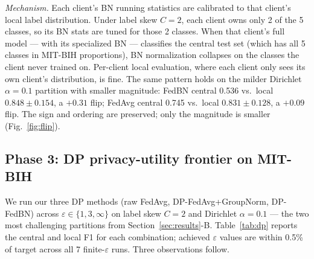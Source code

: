 \documentclass[conference]{IEEEtran}
\begin{document}
\emph{Mechanism.} Each client's BN running statistics are calibrated to that client's local label distribution. Under label skew $C{=}2$, each client owns only 2 of the 5 classes, so its BN stats are tuned for those 2 classes. When that client's full model --- with its specialized BN --- classifies the central test set (which has all 5 classes in MIT-BIH proportions), BN normalization collapses on the classes the client never trained on. Per-client local evaluation, where each client only sees its own client's distribution, is fine. The same pattern holds on the milder Dirichlet $\alpha{=}0.1$ partition with smaller magnitude: FedBN central 0.536 vs.\ local $0.848 \pm 0.154$, a $+0.31$ flip; FedAvg central 0.745 vs.\ local $0.831 \pm 0.128$, a $+0.09$ flip. The sign and ordering are preserved; only the magnitude is smaller (Fig.~\ref{fig:flip}).

\subsection{Phase 3: DP privacy-utility frontier on MIT-BIH}
We run our three DP methods (raw FedAvg, DP-FedAvg+GroupNorm, DP-FedBN) across $\varepsilon \in \{1, 3, \infty\}$ on label skew $C{=}2$ and Dirichlet $\alpha{=}0.1$ --- the two most challenging partitions from Section~\ref{sec:results}-B. Table~\ref{tab:dp} reports the central and local F1 for each combination; achieved $\varepsilon$ values are within 0.5\% of target across all 7 finite-$\varepsilon$ runs. Three observations follow.
\end{document}

